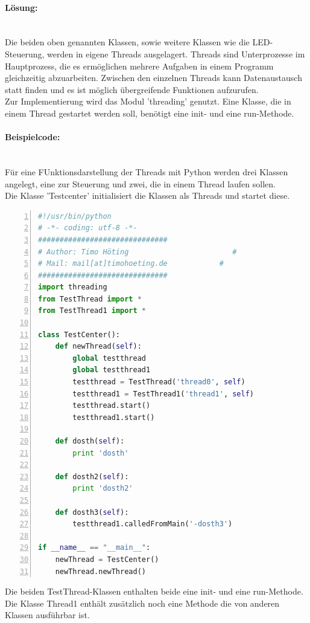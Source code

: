 \paragraph{Lösung:} \\ Die beiden oben genannten Klassen, sowie weitere Klassen wie die LED-Steuerung, werden in eigene Threads ausgelagert. Threads sind Unterprozesse im Hauptprozess, die es ermöglichen mehrere Aufgaben in einem Programm gleichzeitig abzuarbeiten. Zwischen den einzelnen Threads kann Datenaustausch statt finden und es ist möglich übergreifende Funktionen aufzurufen. \\
Zur Implementierung wird das Modul 'threading' genutzt. Eine Klasse, die in einem Thread gestartet werden soll, benötigt eine init- und eine run-Methode.
\paragraph{Beispielcode:}\\
Für eine FUnktionsdarstellung der Threads mit Python werden drei Klassen angelegt, eine zur Steuerung und zwei, die in einem Thread laufen sollen. \\
Die Klasse 'Testcenter' initialisiert die Klassen als Threads und startet diese.
\begin{lstlisting}[caption=Klasse Testcenter, language=python, frame=single, breaklines=true,columns=fullflexible, commentstyle=\color{gray}\upshape, captionpos=b, numbers = left]
#!/usr/bin/python
# -*- coding: utf-8 -*-
##############################
# Author: Timo Höting                        #
# Mail: mail[at]timohoeting.de            #
##############################
import threading
from TestThread import *
from TestThread1 import *

class TestCenter():
    def newThread(self):
        global testthread
        global testthread1
        testthread = TestThread('thread0', self)
        testthread1 = TestThread1('thread1', self)
        testthread.start()
        testthread1.start()

    def dosth(self):
        print 'dosth'

    def dosth2(self):
        print 'dosth2'

    def dosth3(self):
        testthread1.calledFromMain('-dosth3')

if __name__ == "__main__":
    newThread = TestCenter()
    newThread.newThread()
\end{lstlisting}
Die beiden TestThread-Klassen enthalten beide eine init- und eine run-Methode. Die Klasse Thread1 enthält zusätzlich noch eine Methode die von anderen Klassen ausführbar ist. 
